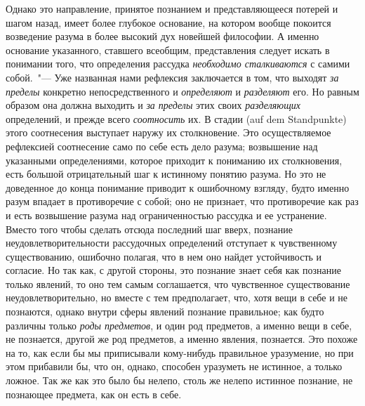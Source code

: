 
Однако это направление, принятое познанием и представляющееся
потерей и шагом назад, имеет более глубокое
основание, на котором вообще покоится возведение
разума в более высокий дух новейшей философии. А
именно основание указанного, ставшего всеобщим, представления
следует искать в понимании того, что определения
рассудка \emph{необходимо сталкиваются} с самими собой.~"---
Уже названная нами рефлексия заключается в
том, что выходят \emph{за пределы} конкретно непосредственного
и \emph{определяют} и \emph{разделяют} его. Но равным образом
она должна выходить и \emph{за пределы} этих своих \emph{разделяющих}
определений, и прежде всего \emph{соотносить} их.
В стадии (auf dem Standpunkte) этого соотнесения выступает
наружу их столкновение. Это осуществляемое
рефлексией соотнесение само по себе есть дело разума;
возвышение над указанными определениями, которое
приходит к пониманию их столкновения, есть большой
отрицательный шаг к истинному понятию разума. Но
это не доведенное до конца понимание приводит к ошибочному
взгляду, будто именно разум впадает в противоречие
с собой; оно не признает, что противоречие как
раз и есть возвышение разума над ограниченностью
рассудка и ее устранение. Вместо того чтобы сделать
отсюда последний шаг вверх, познание неудовлетворительности
рассудочных определений отступает к чувственному
существованию, ошибочно полагая, что в нем оно
найдет устойчивость и согласие. Но так как, с другой
стороны, это познание знает себя как познание только
явлений, то оно тем самым соглашается, что чувственное
существование неудовлетворительно, но вместе с тем
предполагает, что, хотя вещи в себе и не познаются,
однако внутри сферы явлений познание правильное; как
будто различны только \emph{роды предметов}, и один род предметов,
а именно вещи в себе, не познается, другой же
род предметов, а именно явления, познается. Это похоже
на то, как если бы мы приписывали кому-нибудь правильное
уразумение, но при этом прибавили бы, что он,
однако, способен уразуметь не истинное, а только ложное.
Так же как это было бы нелепо, столь же нелепо
истинное познание, не познающее предмета, как он есть
в себе.

